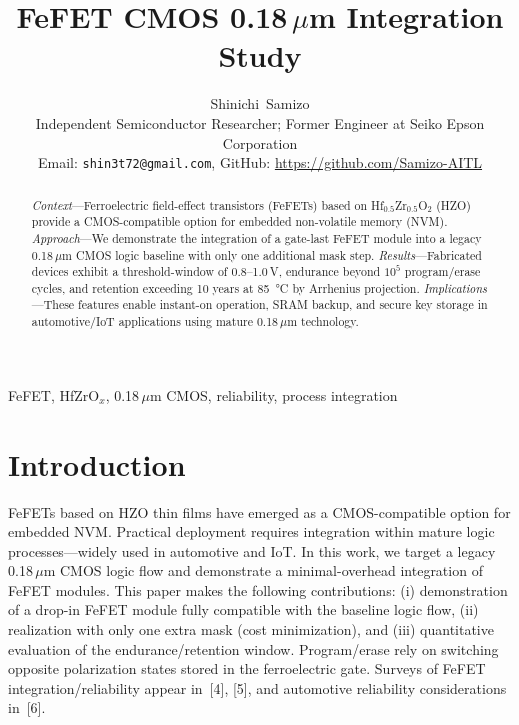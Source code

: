 \documentclass[journal]{IEEEtran}
\begin{document}
\title{FeFET CMOS 0.18\,$\mu$m Integration Study}

\author{Shinichi~Samizo\\
\small Independent Semiconductor Researcher; Former Engineer at Seiko Epson Corporation\\
\small Email: \texttt{shin3t72@gmail.com},\; GitHub: \url{https://github.com/Samizo-AITL}
}
\maketitle

\begin{abstract}
\textit{Context}—Ferroelectric field-effect transistors (FeFETs) based on Hf$_{0.5}$Zr$_{0.5}$O$_2$ (HZO) provide a CMOS-compatible option for embedded non-volatile memory (NVM). \textit{Approach}—We demonstrate the integration of a gate-last FeFET module into a legacy 0.18\,$\mu$m CMOS logic baseline with only one additional mask step. \textit{Results}—Fabricated devices exhibit a threshold-window of 0.8–1.0\,V, endurance beyond $10^5$ program/erase cycles, and retention exceeding 10 years at \SI{85}{\celsius} by Arrhenius projection. \textit{Implications}—These features enable instant-on operation, SRAM backup, and secure key storage in automotive/IoT applications using mature 0.18\,$\mu$m technology.
\end{abstract}

\begin{IEEEkeywords}
FeFET, HfZrO$_x$, 0.18\,$\mu$m CMOS, reliability, process integration
\end{IEEEkeywords}

\section{Introduction}
FeFETs based on HZO thin films have emerged as a CMOS-compatible option for embedded NVM. Practical deployment requires integration within mature logic processes—widely used in automotive and IoT. In this work, we target a legacy 0.18\,$\mu$m CMOS logic flow and demonstrate a minimal-overhead integration of FeFET modules. This paper makes the following contributions: (i) demonstration of a drop-in FeFET module fully compatible with the baseline logic flow, (ii) realization with only one extra mask (cost minimization), and (iii) quantitative evaluation of the endurance/retention window. Program/erase rely on switching opposite polarization states stored in the ferroelectric gate. Surveys of FeFET integration/reliability appear in~[4], [5], and automotive reliability considerations in~[6].
\end{document}
